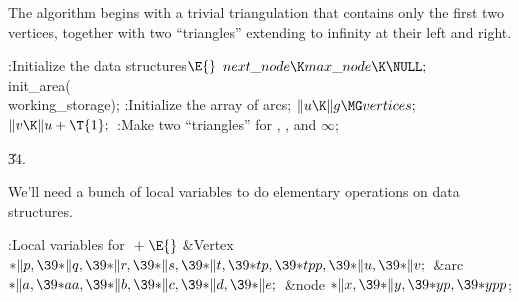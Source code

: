 The algorithm begins with a trivial triangulation that contains
only the first two vertices, together with two ``triangles'' extending
to infinity at their left and right.

\Y\B\4:Initialize the data structures\X${}\E{}$\6
$\\{next\_node}\K\\{max\_node}\K\NULL;{}$\6
\\{init\_area}(\\{working\_storage});\6
:Initialize the array of arcs\X;\6
${}\|u\K\|g\MG\\{vertices};{}$\6
${}\|v\K\|u+\T{1};{}$\6
:Make two ``triangles'' for , , and $\infty$\X;\par
\U34.\fi

We'll need a bunch of local variables to do elementary operations on
data structures.

\Y\B\4:Local variables for \X${}\mathrel+\E{}$\6
\&{Vertex} ${}{*}\|p,\39{*}\|q,\39{*}\|r,\39{*}\|s,\39{*}\|t,\39{*}\\{tp},%
\39{*}\\{tpp},\39{*}\|u,\39{*}\|v;{}$\6
\&{arc} ${}{*}\|a,\39{*}\\{aa},\39{*}\|b,\39{*}\|c,\39{*}\|d,\39{*}\|e;{}$\6
\&{node} ${}{*}\|x,\39{*}\|y,\39{*}\\{yp},\39{*}\\{ypp}{}$;\par
\fi

